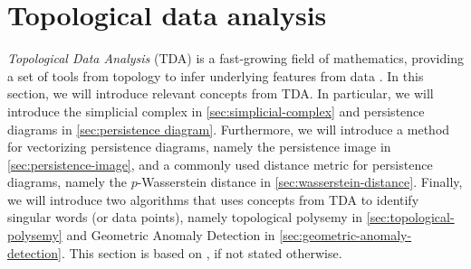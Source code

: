 \section{Topological data analysis}
\label{sec:topological-data-analysis}
\textit{Topological Data Analysis} (TDA) is a fast-growing field of mathematics, providing a set of tools from topology to infer underlying features from data \cite{chazal2021introduction}. In this section, we will introduce relevant concepts from TDA. In particular, we will introduce the simplicial complex in \cref{sec:simplicial-complex} and persistence diagrams in \cref{sec:persistence diagram}. Furthermore, we will introduce a method for vectorizing persistence diagrams, namely the persistence image in \cref{sec:persistence-image}, and a commonly used distance metric for persistence diagrams, namely the $p$-Wasserstein distance in \cref{sec:wasserstein-distance}. Finally, we will introduce two algorithms that uses concepts from TDA to identify singular words (or data points), namely topological polysemy in \cref{sec:topological-polysemy} and Geometric Anomaly Detection in \cref{sec:geometric-anomaly-detection}. This section is based on \cite{Edelsbrunner2010,chazal2021introduction}, if not stated otherwise.

